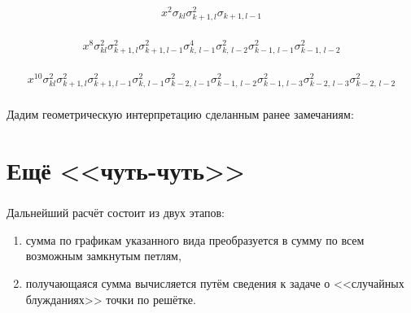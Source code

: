 \documentclass[c]{beamer}
\begin{document}
\begin{frame}
\frametitle{\insertsection}
\begin{center}
\end{center}
\[
x^2 \sigma_{kl}\sigma_{k+1,l}^2 \sigma_{k+1,l-1}
\] 
\end{frame}
\begin{frame}
\frametitle{\insertsection}
\begin{center}
\end{center}
\[
x^8 \sigma_{kl}^2\sigma_{k+1,l}^2 \sigma_{k+1,l-1}^2
\sigma_{k,\,l-1}^4 \sigma_{k,\,l-2}^2\sigma_{k-1,\,l-1}^2
\sigma_{k-1,\,l-2}^2
\] 
\end{frame}
\begin{frame}
\frametitle{\insertsection}
\begin{center}
\end{center}
\[
x^{10} \sigma_{kl}^2\sigma_{k+1,l}^2 \sigma_{k+1,l-1}^2
\sigma_{k,\,l-1}^2 \sigma_{k-2,\,l-1}^2\sigma_{k-1,\,l-2}^2
\sigma_{k-1,\,l-3}^2\sigma_{k-2,\,l-3}^2\sigma_{k-2,\,l-2}^2
\] 
\end{frame}
\begin{frame}
\frametitle{\insertsection}
Дадим геометрическую интерпретацию сделанным ранее замечаниям:
\begin{itemize}

\end{itemize}
\end{frame}
\section{Ещё <<чуть-чуть>>}
\begin{frame}
\frametitle{\insertsection}
Дальнейший расчёт состоит из двух этапов:
\begin{enumerate}
\item сумма по графикам указанного вида преобразуется в сумму
	по всем возможным замкнутым петлям,
\item получающаяся сумма вычисляется путём сведения к задаче
	о <<случайных блужданиях>> точки по решётке.
\end{enumerate}
\end{frame}
\end{document}
